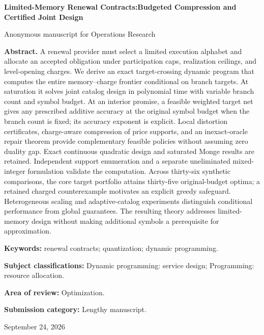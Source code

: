 \documentclass[11pt,letterpaper]{article}
\theoremstyle{definition}\newtheorem{assumption}[theorem]{Assumption}
\begin{document}
\hypersetup{pageanchor=false}
\begin{titlepage}\centering
{\Large\bfseries Limited-Memory Renewal Contracts:\newline Budgeted Compression and Certified Joint Design\par}
\vspace{.3in}Anonymous manuscript for Operations Research\par\vspace{.2in}
\begin{minipage}{\textwidth}\textbf{Abstract.} A renewal provider must select a limited execution alphabet and allocate an accepted obligation under participation caps, realization ceilings, and level-opening charges. We derive an exact target-crossing dynamic program that computes the entire memory--charge frontier conditional on branch targets. At saturation it solves joint catalog design in polynomial time with variable branch count and symbol budget. At an interior promise, a feasible weighted target net gives any prescribed additive accuracy at the original symbol budget when the branch count is fixed; its accuracy exponent is explicit. Local distortion certificates, charge-aware compression of price supports, and an inexact-oracle repair theorem provide complementary feasible policies without assuming zero duality gap. Exact continuous quadratic design and saturated Monge results are retained. Independent support enumeration and a separate uneliminated mixed-integer formulation validate the computation. Across thirty-six synthetic comparisons, the core target portfolio attains thirty-five original-budget optima; a retained charged counterexample motivates an explicit greedy safeguard. Heterogeneous scaling and adaptive-catalog experiments distinguish conditional performance from global guarantees. The resulting theory addresses limited-memory design without making additional symbols a prerequisite for approximation.
\par\vspace{.15in}\textbf{Keywords:} renewal contracts; quantization; dynamic programming.
\par\vspace{.1in}\textbf{Subject classifications:} Dynamic programming: service design; Programming: resource allocation.
\par\vspace{.1in}\textbf{Area of review:} Optimization.
\par\vspace{.1in}\textbf{Submission category:} Lengthy manuscript.
\end{minipage}\vfill September 24, 2026\end{titlepage}
\end{document}
